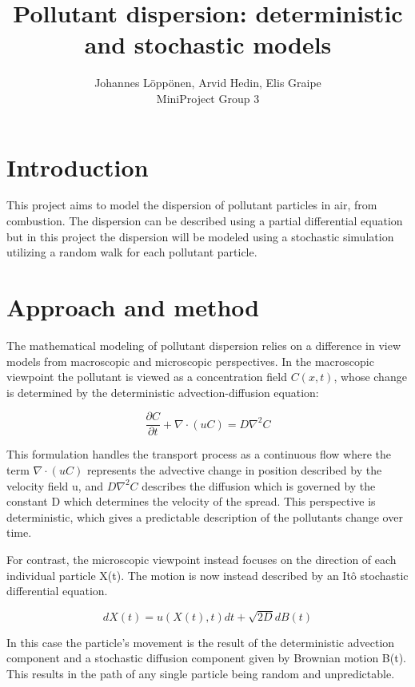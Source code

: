 \documentclass[11pt]{article}
\title{Pollutant dispersion: deterministic and stochastic models}
\author{Johannes Löppönen, Arvid Hedin, Elis Graipe \\
    MiniProject Group 3}
\date{}
\begin{document}
    
    \maketitle



    \section{Introduction}\label{introduction}

    This project aims to model the dispersion of pollutant particles in air,
from combustion. The dispersion can be described using a partial
differential equation but in this project the dispersion will be modeled
using a stochastic simulation utilizing a random walk for each pollutant
particle.

    \section{Approach and method}\label{approach-and-method}

    The mathematical modeling of pollutant dispersion relies on a difference
in view models from macroscopic and microscopic perspectives. In the
macroscopic viewpoint the pollutant is viewed as a concentration field
\(C(x, t)\), whose change is determined by the deterministic
advection-diffusion equation:

\[\frac{\partial C}{\partial t} + \nabla \cdot (uC) = D\nabla^{2}C\]

This formulation handles the transport process as a continuous flow
where the term \(\nabla \cdot (uC)\) represents the advective change in
position described by the velocity field u, and \(D\nabla^{2}C\)
describes the diffusion which is governed by the constant D which
determines the velocity of the spread. This perspective is
deterministic, which gives a predictable description of the pollutants
change over time.

For contrast, the microscopic viewpoint instead focuses on the direction
of each individual particle X(t). The motion is now instead described by
an Itô stochastic differential equation.

\[dX(t) = u(X(t), t)dt + \sqrt{2D}dB(t)\]

In this case the particle's movement is the result of the deterministic
advection component and a stochastic diffusion component given by
Brownian motion B(t). This results in the path of any single particle
being random and unpredictable.
\end{document}
